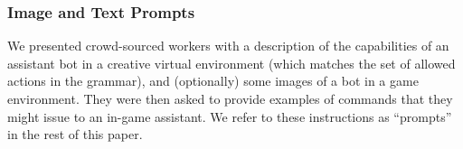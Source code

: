 

\subsubsection{Image and Text Prompts} \label{sec:prompts}We presented crowd-sourced workers with a description of the capabilities of an assistant bot in a creative virtual environment (which matches the set of allowed actions in the grammar), and (optionally) some images of a bot in a game environment. They were then asked to provide examples of commands that they might issue to an in-game assistant. We refer to these instructions as ``prompts'' in the rest of this paper.


